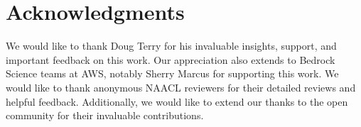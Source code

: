 \section*{Acknowledgments}
We would like to thank Doug Terry for his invaluable insights, support, and important feedback on this work.
Our appreciation also extends to Bedrock Science teams at AWS, notably Sherry Marcus for supporting this work.
We would like to thank anonymous NAACL reviewers for their detailed reviews and helpful feedback.
Additionally, we would like to extend our thanks to the open community for their invaluable contributions.
